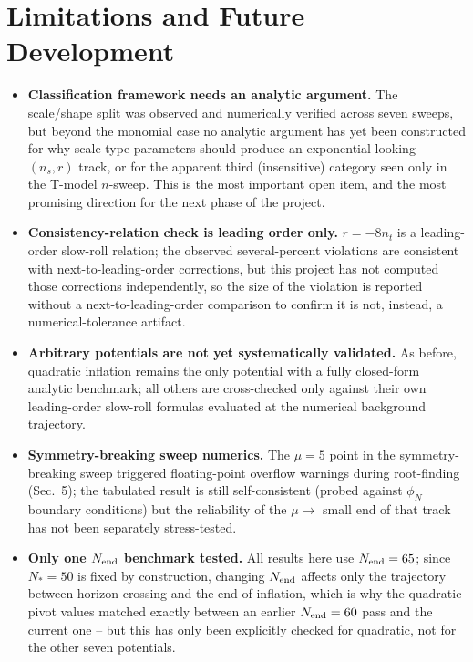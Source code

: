 \documentclass[11pt]{article}
\begin{document}
\section{Limitations and Future Development}
\label{sec:limitations}
\begin{itemize}
\item \textbf{Classification framework needs an analytic argument.} The scale/shape split
was observed and numerically verified across seven sweeps, but beyond the monomial case
no analytic argument has yet been constructed for why scale-type parameters should
produce an exponential-looking $(n_s,r)$ track, or for the apparent third (insensitive)
category seen only in the T-model $n$-sweep. This is the most important open item, and
the most promising direction for the next phase of the project.
\item \textbf{Consistency-relation check is leading order only.} $r=-8n_t$ is a
leading-order slow-roll relation; the observed several-percent violations are consistent
with next-to-leading-order corrections, but this project has not computed those
corrections independently, so the size of the violation is reported without a
next-to-leading-order comparison to confirm it is not, instead, a numerical-tolerance
artifact.
\item \textbf{Arbitrary potentials are not yet systematically validated.} As before,
quadratic inflation remains the only potential with a fully closed-form analytic
benchmark; all others are cross-checked only against their own leading-order slow-roll
formulas evaluated at the numerical background trajectory.
\item \textbf{Symmetry-breaking sweep numerics.} The $\mu=5$ point in the symmetry-breaking
sweep triggered floating-point overflow warnings during root-finding (Sec.~5); the
tabulated result is still self-consistent (probed against $\phi_N$ boundary conditions)
but the reliability of the $\mu\to$ small end of that track has not been separately
stress-tested.
\item \textbf{Only one $N_{\rm end}$ benchmark tested.} All results here use
$N_{\rm end}=65$; since $N_*=50$ is fixed by construction, changing $N_{\rm end}$ affects
only the trajectory between horizon crossing and the end of inflation, which is why the
quadratic pivot values matched exactly between an earlier $N_{\rm end}=60$ pass and the
current one -- but this has only been explicitly checked for quadratic, not for the other
seven potentials.
\end{itemize}
\end{document}
